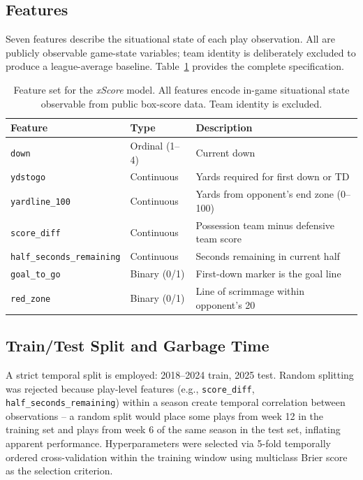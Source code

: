 \documentclass[12pt,a4paper]{article}
\newcommand{\xscore}{\textit{xScore}}
\begin{document}
\subsection{Features}

Seven features describe the situational state of each play observation. All are publicly observable game-state variables; team identity is deliberately excluded to produce a league-average baseline. Table~\ref{tab:features} provides the complete specification.

\begin{table}[htbp]
  \centering
  \caption{Feature set for the \xscore{} model. All features encode in-game situational state observable from public box-score data. Team identity is excluded.}
  \label{tab:features}
  \small
  \begin{tabularx}{\textwidth}{l l X}
    \toprule
    \textbf{Feature} & \textbf{Type} & \textbf{Description} \\
    \midrule
    \texttt{down} & Ordinal (1--4) & Current down \\
    \texttt{ydstogo} & Continuous & Yards required for first down or TD \\
    \texttt{yardline\_100} & Continuous & Yards from opponent's end zone (0--100) \\
    \texttt{score\_diff} & Continuous & Possession team minus defensive team score \\
    \texttt{half\_seconds\_remaining} & Continuous & Seconds remaining in current half \\
    \texttt{goal\_to\_go} & Binary (0/1) & First-down marker is the goal line \\
    \texttt{red\_zone} & Binary (0/1) & Line of scrimmage within opponent's 20 \\
    \bottomrule
  \end{tabularx}
\end{table}

\subsection{Train/Test Split and Garbage Time}

A strict temporal split is employed: 2018--2024 train, 2025 test. Random splitting was rejected because play-level features (e.g., \texttt{score\_diff}, \texttt{half\_seconds\_\allowbreak remaining}) within a season create temporal correlation between observations -- a random split would place some plays from week 12 in the training set and plays from week 6 of the same season in the test set, inflating apparent performance. Hyperparameters were selected via 5-fold temporally ordered cross-validation within the training window using multiclass Brier score as the selection criterion.
\end{document}
